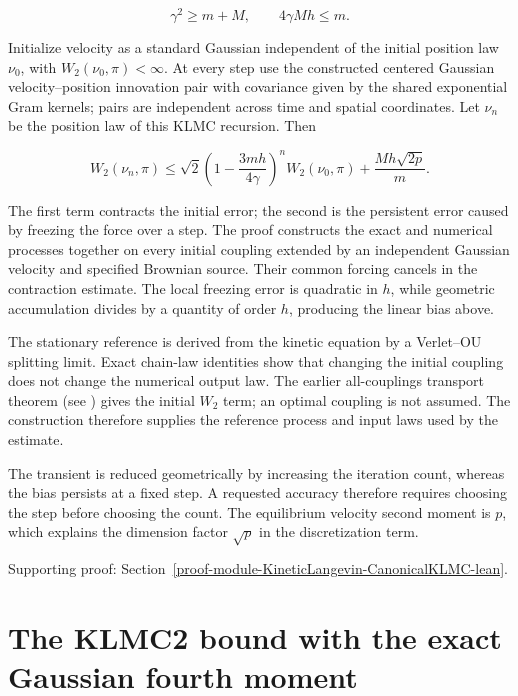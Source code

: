 \documentclass[11pt,a4paper]{report}
\begin{document}
\[\gamma^2\ge m+M,\qquad 4\gamma Mh\le m.\]


Initialize velocity as a standard Gaussian independent of the initial
position law \(\nu_0\), with \(W_2(\nu_0,\pi)<\infty\).
At every step use the constructed centered Gaussian velocity–position
innovation pair with covariance given by the shared exponential Gram kernels;
pairs are independent across time and spatial coordinates. Let \(\nu_n\)
be the position law of this KLMC recursion. Then


\[\boxed{W_2(\nu_n,\pi)\le
\sqrt2\left(1-\frac{3mh}{4\gamma}\right)^nW_2(\nu_0,\pi)
+\frac{Mh\sqrt{2p}}m.}\]


The first term contracts the initial error; the second is the persistent
error caused by freezing the force over a step. The proof constructs the
exact and numerical processes together on every initial coupling extended
by an independent Gaussian velocity and specified Brownian source. Their
common forcing cancels in the contraction estimate. The local freezing error
is quadratic in \(h\), while geometric accumulation divides by a quantity
of order \(h\), producing the linear bias above.




The stationary reference is derived from the kinetic equation by a
Verlet–OU splitting limit. Exact chain-law identities show that changing the
initial coupling does not change the numerical output law. The earlier all-couplings transport theorem (see \cite[Section~3.18.4]{LangevinLean2026ULASC}) gives the initial \(W_2\) term; an optimal coupling is
not assumed. The construction therefore supplies the reference process and input laws used by the estimate.



The transient is reduced geometrically by increasing the iteration count, whereas the bias persists at a fixed step. A requested accuracy therefore requires choosing the step before choosing the count. The equilibrium velocity second moment is \(p\), which explains the dimension factor \(\sqrt p\) in the discretization term.


{\small\color{gray}Supporting proof: Section~\ref{proof-module-KineticLangevin-CanonicalKLMC-lean}.\par}
\section{\texorpdfstring{The KLMC2 bound with the exact Gaussian fourth moment}{The KLMC2 bound with the exact Gaussian fourth moment}}
\end{document}
